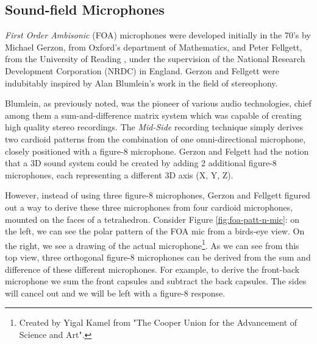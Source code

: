 \subsection{Sound-field Microphones} \label{subsec:sf-mics}

\textit{First Order Ambisonic} (FOA) microphones were developed initially in the 70's by Michael Gerzon, from Oxford's department of Mathematics, and Peter Fellgett, from the University of Reading \cite{elen1991whatever}, under the supervision of the National Research Development Corporation (NRDC) in England. Gerzon and Fellgett were indubitably inspired by Alan Blumlein's work in the field of stereophony. 

Blumlein, as previously noted, was the pioneer of various audio technologies, chief among them a sum-and-difference matrix system which was capable of creating high quality stereo recordings. The \textit{Mid-Side} recording technique simply derives two cardioid patterns from the combination of one omni-directional microphone, closely positioned with a figure-8 microphone. Gerzon and Felgett had the notion that a 3D sound system could be created by adding 2 additional figure-8 microphones, each representing a different 3D axis (X, Y, Z). 

However, instead of using three figure-8 microphones, Gerzon and Fellgett figured out a way to derive these three microphones from four cardioid microphones, mounted on the faces of a tetrahedron. Consider Figure \ref{fig:foa-patt-n-mic}: on the left, we can see the polar pattern of the FOA mic from a birds-eye view. On the right, we see a drawing of the actual microphone\footnote{Created by Yigal Kamel from "The Cooper Union for the Advancement of Science and Art".}. As we can see from this top view, three orthogonal figure-8 microphones can be derived from the sum and difference of these different microphones. For example, to derive the front-back microphone we sum the front capsules and subtract the back capsules. The sides will cancel out and we will be left with a figure-8 response. 

